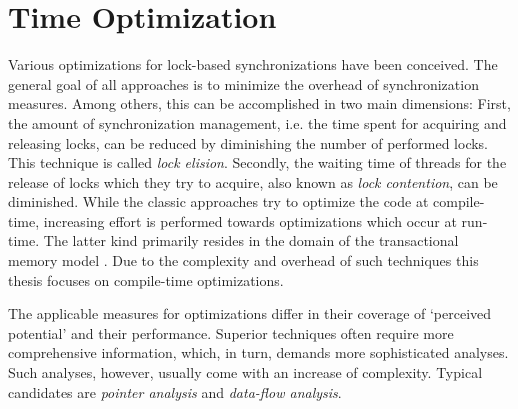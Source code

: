 \section{Time Optimization}
Various optimizations for lock-based synchronizations have been conceived. The general goal of all approaches is to minimize the overhead of synchronization measures. Among others, this can be accomplished in two main dimensions: First, the amount of synchronization management, i.e. the time spent for acquiring and releasing locks, can be reduced by diminishing the number of performed locks. This technique is called \textit{lock elision}. Secondly, the waiting time of threads for the release of locks which they try to acquire, also known as \textit{lock contention}, can be diminished. While the classic approaches try to optimize the code at compile-time, increasing effort is performed towards optimizations which occur at run-time. The latter kind primarily resides in the domain of the transactional memory model \cite{SpeculativeLockElision}\cite{ARuntimeSystem}. Due to the complexity and overhead of such techniques this thesis focuses on compile-time optimizations.

The applicable measures for optimizations differ in their coverage of `perceived potential' and their performance. Superior techniques often require more comprehensive information, which, in turn, demands more sophisticated analyses. Such analyses, however, usually come with an increase of complexity. Typical candidates are \textit{pointer analysis} and \textit{data-flow analysis}.

